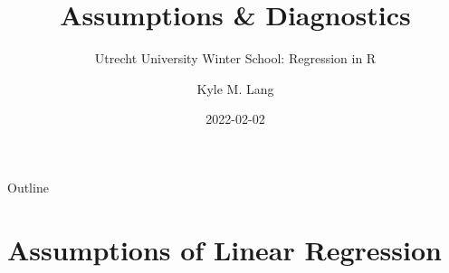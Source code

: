\documentclass[10pt]{beamer}\usepackage[]{graphicx}\usepackage[]{color}
\title{Assumptions \& Diagnostics}
\subtitle{Utrecht University Winter School: Regression in R}
\author{Kyle M. Lang}
\institute{Department of Methodology \& Statistics\\Utrecht University}
\date{2022-02-02}
\begin{document}

\begin{frame}[t, plain]
  \titlepage
\end{frame}


\begin{frame}{Outline}
  \tableofcontents
\end{frame}


\section{Assumptions of Linear Regression}

\end{document}
